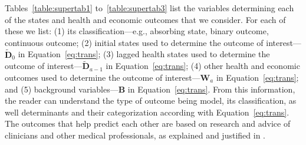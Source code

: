 Tables~\ref{table:supertab1} to~\ref{table:supertab3} list the variables determining each of the states and health and economic outcomes that we consider. For each of these we list: (1) its classification---e.g., absorbing state, binary outcome, continuous outcome; (2) initial states used to determine the outcome of interest---$\tilde{\bm{D}}_0$ in Equation~\eqref{eq:trans}; (3) lagged health states used to determine the outcome of interest---$\tilde{\bm{D}}_{a-1}$ in Equation~\eqref{eq:trans}; (4) other health and economic outcomes used to determine the outcome of interest---$\bm{W}_a$ in Equation~\eqref{eq:trans}; and (5) background variables---$\bm{B}$ in Equation~\eqref{eq:trans}. From this information, the reader can understand the type of outcome being model, its classification, as well determinants and their categorization according with Equation~\eqref{eq:trans}. The outcomes that help predict each other are based on research and advice of clinicians and other medical professionals, as explained and justified in \citet{Goldman_etal_2015_Future-Elderly-Model-Report}.

